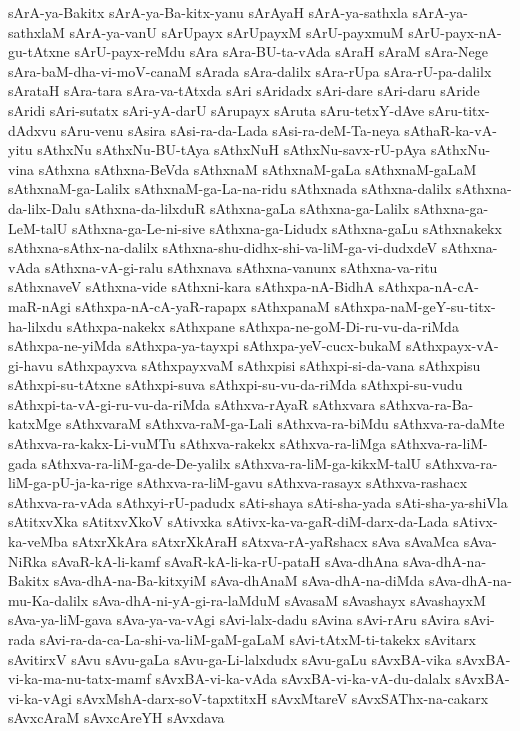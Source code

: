 {sArA-ya-Bakitx
sArA-ya-Ba-kitx-yanu
sArAyaH
sArA-ya-sathxla
sArA-ya-sathxlaM
sArA-ya-vanU
sArUpayx
sArUpayxM
sArU-payxmuM
sArU-payx-nA-gu-tAtxne
sArU-payx-reMdu
sAra
sAra-BU-ta-vAda
sAraH
sAraM
sAra-Nege
sAra-baM-dha-vi-moV-canaM
sArada
sAra-dalilx
sAra-rUpa
sAra-rU-pa-dalilx
sArataH
sAra-tara
sAra-va-tAtxda
sAri
sAridadx
sAri-dare
sAri-daru
sAride
sAridi
sAri-sutatx
sAri-yA-darU
sArupayx
sAruta
sAru-tetxY-dAve
sAru-titx-dAdxvu
sAru-venu
sAsira
sAsi-ra-da-Lada
sAsi-ra-deM-Ta-neya
sAthaR-ka-vA-yitu
sAthxNu
sAthxNu-BU-tAya
sAthxNuH
sAthxNu-savx-rU-pAya
sAthxNu-vina
sAthxna
sAthxna-BeVda
sAthxnaM
sAthxnaM-gaLa
sAthxnaM-gaLaM
sAthxnaM-ga-Lalilx
sAthxnaM-ga-La-na-ridu
sAthxnada
sAthxna-dalilx
sAthxna-da-lilx-Dalu
sAthxna-da-lilxduR
sAthxna-gaLa
sAthxna-ga-Lalilx
sAthxna-ga-LeM-talU
sAthxna-ga-Le-ni-sive
sAthxna-ga-Lidudx
sAthxna-gaLu
sAthxnakekx
sAthxna-sAthx-na-dalilx
sAthxna-shu-didhx-shi-va-liM-ga-vi-dudxdeV
sAthxna-vAda
sAthxna-vA-gi-ralu
sAthxnava
sAthxna-vanunx
sAthxna-va-ritu
sAthxnaveV
sAthxna-vide
sAthxni-kara
sAthxpa-nA-BidhA
sAthxpa-nA-cA-maR-nAgi
sAthxpa-nA-cA-yaR-rapapx
sAthxpanaM
sAthxpa-naM-geY-su-titx-ha-lilxdu
sAthxpa-nakekx
sAthxpane
sAthxpa-ne-goM-Di-ru-vu-da-riMda
sAthxpa-ne-yiMda
sAthxpa-ya-tayxpi
sAthxpa-yeV-cucx-bukaM
sAthxpayx-vA-gi-havu
sAthxpayxva
sAthxpayxvaM
sAthxpisi
sAthxpi-si-da-vana
sAthxpisu
sAthxpi-su-tAtxne
sAthxpi-suva
sAthxpi-su-vu-da-riMda
sAthxpi-su-vudu
sAthxpi-ta-vA-gi-ru-vu-da-riMda
sAthxva-rAyaR
sAthxvara
sAthxva-ra-Ba-katxMge
sAthxvaraM
sAthxva-raM-ga-Lali
sAthxva-ra-biMdu
sAthxva-ra-daMte
sAthxva-ra-kakx-Li-vuMTu
sAthxva-rakekx
sAthxva-ra-liMga
sAthxva-ra-liM-gada
sAthxva-ra-liM-ga-de-De-yalilx
sAthxva-ra-liM-ga-kikxM-talU
sAthxva-ra-liM-ga-pU-ja-ka-rige
sAthxva-ra-liM-gavu
sAthxva-rasayx
sAthxva-rashacx
sAthxva-ra-vAda
sAthxyi-rU-padudx
sAti-shaya
sAti-sha-yada
sAti-sha-ya-shiVla
sAtitxvXka
sAtitxvXkoV
sAtivxka
sAtivx-ka-va-gaR-diM-darx-da-Lada
sAtivx-ka-veMba
sAtxrXkAra
sAtxrXkAraH
sAtxva-rA-yaRshacx
sAva
sAvaMca
sAva-NiRka
sAvaR-kA-li-kamf
sAvaR-kA-li-ka-rU-pataH
sAva-dhAna
sAva-dhA-na-Bakitx
sAva-dhA-na-Ba-kitxyiM
sAva-dhAnaM
sAva-dhA-na-diMda
sAva-dhA-na-mu-Ka-dalilx
sAva-dhA-ni-yA-gi-ra-laMduM
sAvasaM
sAvashayx
sAvashayxM
sAva-ya-liM-gava
sAva-ya-va-vAgi
sAvi-lalx-dadu
sAvina
sAvi-rAru
sAvira
sAvi-rada
sAvi-ra-da-ca-La-shi-va-liM-gaM-gaLaM
sAvi-tAtxM-ti-takekx
sAvitarx
sAvitirxV
sAvu
sAvu-gaLa
sAvu-ga-Li-lalxdudx
sAvu-gaLu
sAvxBA-vika
sAvxBA-vi-ka-ma-nu-tatx-mamf
sAvxBA-vi-ka-vAda
sAvxBA-vi-ka-vA-du-dalalx
sAvxBA-vi-ka-vAgi
sAvxMshA-darx-soV-tapxtitxH
sAvxMtareV
sAvxSAThx-na-cakarx
sAvxcAraM
sAvxcAreYH
sAvxdava
}
